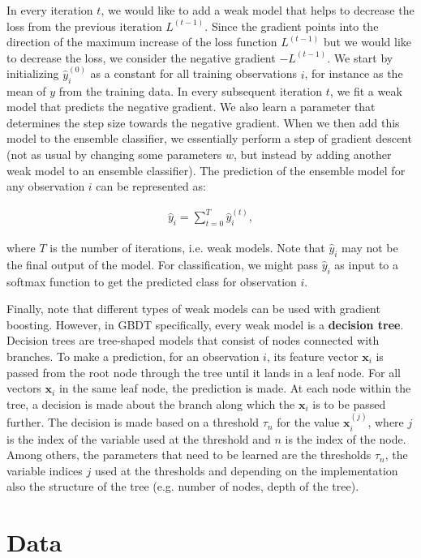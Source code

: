 \documentclass{article}
\begin{document}
	In every iteration $t$, we would like to add a weak model that helps to decrease the loss from the previous iteration $L^{(t-1)}$. Since the gradient points into the direction of the maximum increase of the loss function $L^{(t-1)}$ but we would like to decrease the loss, we consider the negative gradient $-L^{(t-1)}$.
	We start by initializing $\hat{y}_i^{(0)}$ as a constant for all training observations $i$, for instance as the mean of $y$ from the training data. In every subsequent iteration $t$, we fit a weak model that predicts the negative gradient. We also learn a parameter that determines the step size towards the negative gradient. When we then add this model to the ensemble classifier, we essentially perform a step of gradient descent (not as usual by changing some parameters $w$, but instead by adding another weak model to an ensemble classifier). The prediction of the ensemble model for any observation $i$ can be represented as:
	
	\begin{align}
	 \hat{y}_i = \sum_{t = 0}^T \hat{y}_i^{(t)}, 
	\end{align}
	
	where $T$ is the number of iterations, i.e. weak models. Note that $\hat{y}_i$ may not be the final output of the model. For classification, we might pass $\hat{y}_i$ as input to a softmax function to get the predicted class for observation $i$.
	
	Finally, note that different types of weak models can be used with gradient boosting. However, in GBDT specifically, every weak model is a \textbf{decision tree}. Decision trees are tree-shaped models that consist of nodes connected with branches. To make a prediction, for an observation $i$, its feature vector $\textbf{x}_i$ is passed from the root node through the tree until it lands in a leaf node. For all vectors $\textbf{x}_i$ in the same leaf node, the prediction is made. At each node within the tree, a decision is made about the branch along which the $\textbf{x}_i$ is to be passed further. The decision is made based on a threshold $\tau_n$ for the value $\textbf{x}_{i}^{(j)}$, where $j$ is the index of the variable used at the threshold and $n$ is the index of the node. Among others, the parameters that need to be learned are the thresholds $\tau_n$, the variable indices $j$ used at the thresholds and depending on the implementation also the structure of the tree (e.g. number of nodes, depth of the tree).
	
	\section{Data}
	
\end{document}
